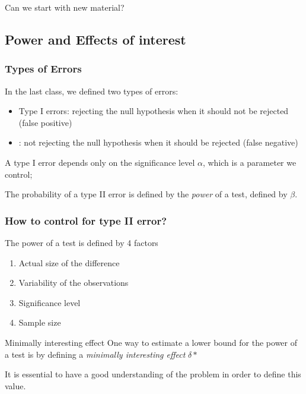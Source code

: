 \documentclass[10pt]{beamer}
\begin{document}
\begin{frame}
  \begin{center}
    Can we start with new material?
  \end{center}
\end{frame}

\subsection{Power and Effects of interest}

\begin{frame}
  \frametitle{Types of Errors}

  In the last class, we defined two types of errors: 
  \begin{itemize}
  \item \alert{Type I errors}: rejecting the null hypothesis when it should
    not be rejected (false positive)
  \item {}: not rejecting the null hypothesis when it
    should be rejected (false negative)
  \end{itemize}
  
  \bigskip

  \begin{block}{}
    A type I error depends only on the significance level $\alpha$, which
    is a parameter we control;

    \medskip

    The probability of a type II error is defined by the \emph{power}
    of a test, defined by $\beta$.
  \end{block}
\end{frame}

\begin{frame}
  \frametitle{How to control for type II error?}
  The power of a test is defined by 4 factors
  \begin{enumerate}
  \item Actual size of the difference
  \item Variability of the observations
  \item Significance level
  \item Sample size
  \end{enumerate}
  
  \begin{block}{Minimally interesting effect}
    One way to estimate a lower bound for the power of a test is by
    defining a \emph{minimally interesting effect} $\delta*$

    \bigskip

    It is essential to have a good understanding of the problem in
    order to define this value.    
  \end{block}

\end{frame}
\end{document}
